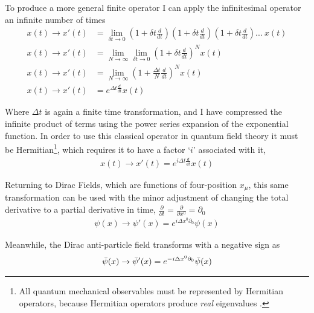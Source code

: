     To produce a more general finite operator I can apply the infinitesimal operator an infinite number of times
    \begin{equation} \begin{split}
    x(t) \to x'(t) &= \lim_{\delta t \to 0} \left(1+\delta t \frac{d}{dt}\right)\left(1+\delta t \frac{d}{dt}\right)\left(1+\delta t \frac{d}{dt}\right)...\ x(t)
    \\x(t) \to x'(t) &= \lim_{N \to \infty} \lim_{\delta t \to 0} \left(1+\delta t \frac{d}{dt}\right)^N x(t)
    \\x(t) \to x'(t) &= \lim_{N \to \infty} \left(1+\frac{\Delta t}{N} \frac{d}{dt}\right)^N x(t)
    \\x(t) \to x'(t) &= e^{\Delta t \frac{d}{dt}} x(t)
    \end{split} \end{equation}

    Where $\Delta t$ is again a finite time transformation,
        and I have compressed the infinite product of terms using the power series expansion of the exponential function.
    In order to use this classical operator in quantum field theory it must be Hermitian\footnote{
        All quantum mechanical observables must be represented by Hermitian operators,
            because Hermitian operators produce \textit{real} eigenvalues \cite{Griffiths_book}.
    },
    which requires it to have a factor `$i$' associated with it,
    \begin{equation} \begin{split}
    x(t) \to x'(t) = e^{i\Delta t \frac{d}{dt}} x(t)
    \end{split} \end{equation}

    Returning to Dirac Fields, which are functions of four-position $x_\mu$, this same transformation can be used
         with the minor adjustment of changing the total derivative to a partial derivative in time,
         $\frac{\partial}{\partial t} = \frac{\partial}{\partial x^0} = \partial_0$
    \begin{equation} \begin{split}
    \psi(x) \to \psi'(x) = e^{i\Delta x^0 \partial_0} \psi(x)
    \end{split} \end{equation}

    Meanwhile, the Dirac anti-particle field transforms with a negative sign as
    \begin{equation} \begin{split}
        \bar{\psi}(x) \to \bar{\psi}'(x) = e^{-i\Delta x^0 \partial_0} \bar{\psi}(x)
    \end{split} \end{equation}
    
